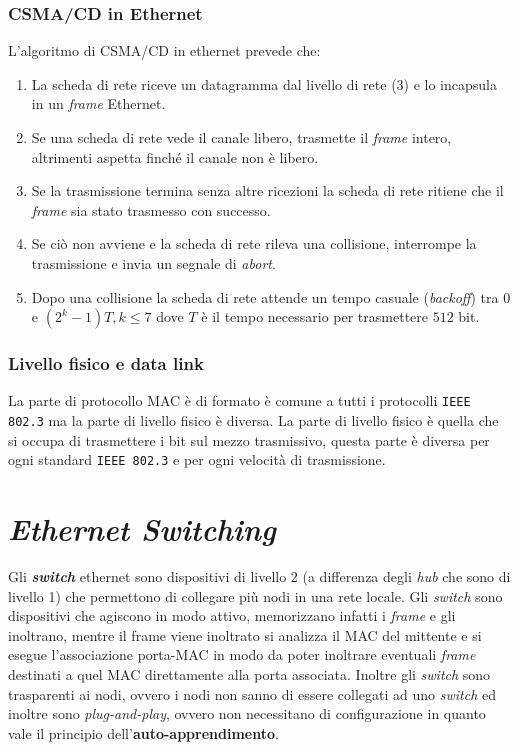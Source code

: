         \subsubsection{\Acrshort*{CSMA/CD} in Ethernet} 
            L'algoritmo di \Acrshort*{CSMA/CD} in ethernet prevede che:
            \begin{enumerate}
                \item La scheda di rete riceve un datagramma dal livello di rete (3) e lo incapsula in un \textit{frame} Ethernet.
                \item Se una scheda di rete vede il canale libero, trasmette il \textit{frame} intero, altrimenti aspetta finché il canale non è libero.
                \item Se la trasmissione termina senza altre ricezioni la scheda di rete ritiene che il \textit{frame} sia stato trasmesso con successo.
                \item Se ciò non avviene e la scheda di rete rileva una collisione, interrompe la trasmissione e invia un segnale di \textit{abort}.
                \item Dopo una collisione la scheda di rete attende un tempo casuale (\textit{backoff}) tra $0$ e $\left(2^k-1\right)T, k\leq 7$ dove $T$ è il tempo necessario per trasmettere $512$ bit.
            \end{enumerate}
        \subsubsection{Livello fisico e data link} 
            La parte di protocollo \Acrshort*{MAC} è di formato è comune a tutti i protocolli \texttt{\Acrshort*{IEEE} 802.3} ma la parte di livello fisico è diversa. La parte di livello fisico è quella che si occupa di trasmettere i bit sul mezzo trasmissivo, questa parte è diversa per ogni standard \texttt{\Acrshort*{IEEE} 802.3} e per ogni velocità di trasmissione.
\section{\textit{Ethernet Switching}}
    Gli \textbf{\textit{switch}} ethernet sono dispositivi di livello 2 (a differenza degli \textit{hub} che sono di livello 1) che permettono di collegare più nodi in una rete locale. Gli \textit{switch} sono dispositivi che agiscono in modo attivo, memorizzano infatti i \textit{frame} e gli inoltrano, mentre il frame viene inoltrato si analizza il \Acrshort*{MAC} del mittente e si esegue l'associazione porta-\Acrshort*{MAC} in modo da poter inoltrare eventuali \textit{frame} destinati a quel \Acrshort*{MAC} direttamente alla porta associata.\newline
    Inoltre gli \textit{switch} sono trasparenti ai nodi, ovvero i nodi non sanno di essere collegati ad uno \textit{switch} ed inoltre sono \textit{plug-and-play}, ovvero non necessitano di configurazione in quanto vale il principio dell'\textbf{auto-}\textbf{apprendimento}.
